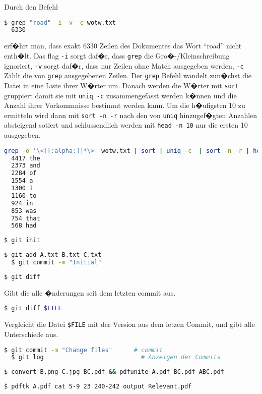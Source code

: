 \documentclass[a4paper,twoside,subproblemsty=arabic,subsubproblemsty=alph, listings]{homeworkassignment}
\begin{document}
\newsubsubproblem
Durch den Befehl
\begin{lstlisting}[language=bash]
  $ grep "road" -i -v -c wotw.txt
  6330
\end{lstlisting}%
erf�hrt man, dass exakt 6330 Zeilen des Dokumentes das Wort ``road''
nicht enth�lt. Das flag \texttt{-i} sorgt daf�r, dass \texttt{grep} die
Gro�-/Kleinschreibung ignoriert, \texttt{-v} sorgt daf�r, dass nur
Zeilen ohne Match ausgegeben werden, \texttt{-c} Z\"ahlt die von
\texttt{grep} ausgegebenen Zeilen.
\newsubsubproblem
Der \texttt{grep} Befehl wandelt zun�chst die Datei in eine Liste
ihrer W�rter um. Danach werden die W�rter mit \texttt{sort} gruppiert
damit sie mit \texttt{uniq -c} zusammengefasst werden k�nnen und die
Anzahl ihrer Vorkommnisse bestimmt werden kann. Um die h�ufigsten 10
zu ermitteln wird dann mit \texttt{sort -n -r} nach den von
\texttt{uniq} hinzugef�gten Anzahlen absteigend sotiert und
schlussendlich werden mit \texttt{head -n 10} nur die ersten 10 ausgegeben.
\begin{lstlisting}[language=bash]
  grep -o '\<[[:alpha:]]*\>' wotw.txt | sort | uniq -c  | sort -n -r | head -n 10
  4417 the
  2373 and
  2284 of
  1554 a
  1300 I
  1160 to
  924 in
  853 was
  754 that
  568 had
\end{lstlisting}
\newsubproblem[4]
\newsubsubproblem
\begin{lstlisting}[language=bash]
  $ git init
\end{lstlisting}
\newsubsubproblem
\begin{lstlisting}[language=bash]
  $ git add A.txt B.txt C.txt
  $ git commit -m "Initial"
\end{lstlisting}
\newsubsubproblem
\begin{lstlisting}[language=bash]
  $ git diff
\end{lstlisting}
Gibt die alle �nderungen seit dem letzten commit aus. 
\begin{lstlisting}[language=bash]
  $ git diff $FILE
\end{lstlisting}
Vergleicht die Datei \texttt{\${}FILE} mit der Version aus dem letzen
Commit, und gibt alle Unterschiede aus.

\newsubsubproblem
\begin{lstlisting}[language=bash]
  $ git commit -m "Change files"      # commit
  $ git log                           # Anzeigen der Commits
\end{lstlisting}

\newsubproblem
\newsubsubproblem
\begin{lstlisting}[language=bash]
  $ convert B.png C.jpg BC.pdf && pdfunite A.pdf BC.pdf ABC.pdf
\end{lstlisting}

\newsubsubproblem
\begin{lstlisting}[language=bash]
  $ pdftk A.pdf cat 5-9 23 240-242 output Relevant.pdf
\end{lstlisting}
\end{document}

